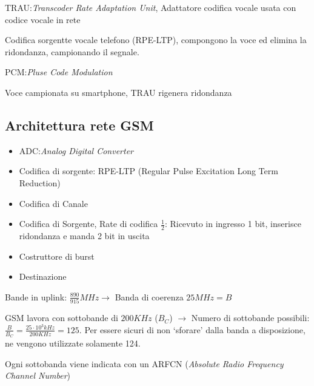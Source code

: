 \documentclass{article}
\begin{document}
TRAU:\@\textit{Transcoder Rate Adaptation Unit}, Adattatore codifica vocale usata con codice vocale in rete

Codifica sorgentte vocale telefono (RPE-LTP), compongono la voce ed elimina la ridondanza, campionando il segnale.

PCM:\@\textit{Pluse Code Modulation}

Voce campionata su smartphone, TRAU rigenera ridondanza
\subsection{Architettura rete GSM}

\begin{itemize}
    \item ADC:\@\textit{Analog Digital Converter}
    \item Codifica di sorgente: RPE-LTP (Regular Pulse Excitation Long Term Reduction)
    \item Codifica di Canale
    \item Codifica di Sorgente, Rate di codifica $\frac{1}{2}$: Ricevuto in ingresso 1 bit, inserisce ridondanza e manda 2 bit in uscita
    \item Costruttore di burst
    \item Destinazione
\end{itemize}

Bande in uplink: $\frac{890}{915} MHz \rightarrow$ Banda di coerenza $25MHz = B$

GSM lavora con sottobande di $200 KHz$ ($B_C$) $\rightarrow$ Numero di sottobande possibili: $\frac{B}{B_C} = \frac{25\cdot10^3 kHz}{200KHz} = 125$. Per essere sicuri di non `sforare' dalla banda a disposizione, ne vengono utilizzate solamente 124.

Ogni sottobanda viene indicata con un ARFCN (\textit{Absolute Radio Frequency Channel Number})
\end{document}

